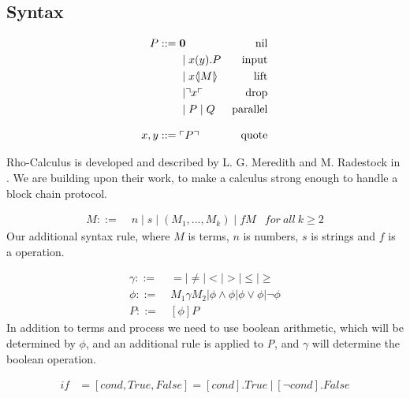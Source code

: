 \subsection{Syntax}
\begin{align*}
    P  ::= \; &  \mathbf{0} & \text{nil} \\
      & \mid x(y).P & \text{input} \\
      & \mid x \langle \! | M | \! \rangle & \text{lift} \\
      & \mid \urcorner x \ulcorner & \text{drop} \\
      & \mid P \mid Q & \text{parallel} \\[3mm]
    x,y ::= \; & \ulcorner P \urcorner & \text{quote}\\
\end{align*}

Rho-Calculus is developed and described by L. G. Meredith and M. Radestock in \citep{Meredith2005}. We are building upon their work, to make a calculus strong enough to handle a block chain protocol.

\begin{align*}
M::=\; & n \mid s \mid (M_1,...,M_k) \mid fM &for\ all\ k \geq 2
\end{align*}
Our additional syntax rule, where $M$ is terms, $n$ is numbers, $s$ is strings and $f$ is a operation.

\begin{align*}
\gamma ::=& \ =|\neq|<|>|\leq|\geq\\
\phi ::=& \ M_1\gamma M_2|\phi\land\phi|\phi\lor\phi|\neg\phi\\
P::=& \ [\phi] P
\end{align*}
In addition to terms and process we need to use boolean arithmetic, which will be determined by \ensuremath{\phi}, and an additional rule is applied to \textit{P}, and \ensuremath{\gamma} will determine the boolean operation.

\begin{align*}
if &= [cond,True,False] = [cond].True\ |\ [\neg cond].False
\end{align*}